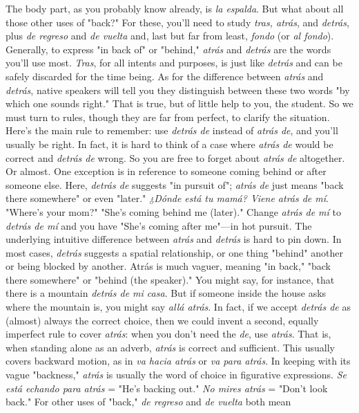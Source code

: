 The body part, as you probably know already, is \emph{la espalda}.
But what about all those other uses of "back?" For these, you'll need
to study \emph{tras, atrás}, and \emph{detrás}, plus \emph{de regreso} and \emph{de vuelta} and, last
but far from least, \emph{fondo} (or \emph{al fondo}).
Generally, to express "in back of" or "behind," \emph{atrás} and \emph{detrás} are the words you'll use most. \emph{Tras}, for all intents and purposes, is
just like \emph{detrás} and can be safely discarded for the time being. As for
the difference between \emph{atrás} and \emph{detrás}, native speakers will tell you
they distinguish between these two words "by which one sounds right."
That is true, but of little help to you, the student. So we must turn to
rules, though they are far from perfect, to clarify the situation.
Here's the main rule to remember: use \emph{detrás de} instead of
\emph{atrás de}, and you'll usually be right. In fact, it is hard to think of a case
where \emph{atrás de} would be correct and \emph{detrás de} wrong. So you are free
to forget about \emph{atrás de} altogether. Or almost. One exception is in reference to someone coming behind or after someone else. Here, \emph{detrás
de} suggests "in pursuit of"; \emph{atrás de} just means "back there somewhere" or even "later." \emph{¿Dónde está tu mamá? Viene atrás de mí}.
"Where's your mom?" "She's coming behind me (later)." Change \emph{atrás
de mí} to \emph{detrás de mí} and you have "She's coming after me"---in
hot pursuit.
The underlying intuitive difference between \emph{atrás} and \emph{detrás}
is hard to pin down. In most cases, \emph{detrás} suggests a spatial relationship, or one thing "behind" another or being blocked by another. Atrás
is much vaguer, meaning "in back," "back there somewhere" or "behind (the speaker)." You might say, for instance, that there is a mountain \emph{detrás de mi casa}. But if someone inside the house asks where the
mountain is, you might say \emph{allá atrás}.
In fact, if we accept \emph{detrás de} as (almost) always the correct
choice, then we could invent a second, equally imperfect rule to cover
\emph{atrás}: when you don't need the \emph{de}, use \emph{atrás}. That is, when standing
alone as an adverb, \emph{atrás} is correct and sufficient. This usually covers
backward motion, as in \emph{va hacia atrás} or \emph{va para atrás}. In keeping
with its vague "backness," \emph{atrás} is usually the word of choice in figurative expressions. \emph{Se está echando para atrás} = "He's backing out."
\emph{No mires atrás} = "Don't look back."
For other uses of "back," \emph{de regreso} and \emph{de vuelta} both mean

